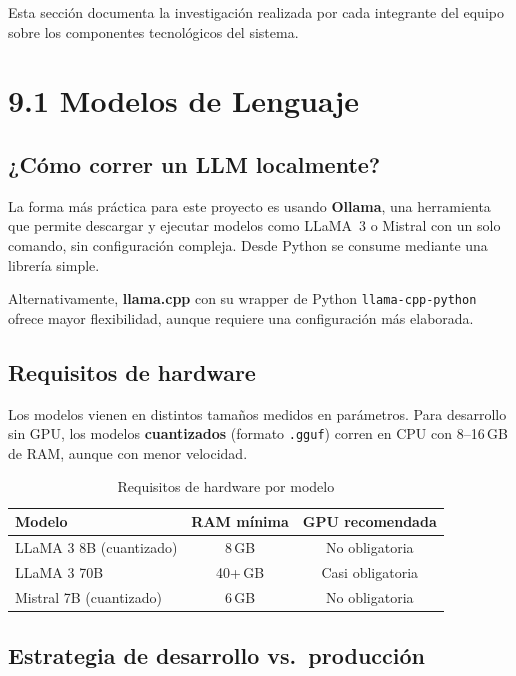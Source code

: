 \documentclass[12pt, a4paper]{report}
\begin{document}
Esta sección documenta la investigación realizada por cada integrante del equipo sobre los
componentes tecnológicos del sistema.

\section*{9.1 Modelos de Lenguaje}

\subsection*{¿Cómo correr un LLM localmente?}

La forma más práctica para este proyecto es usando \textbf{Ollama}, una herramienta que
permite descargar y ejecutar modelos como LLaMA~3 o Mistral con un solo comando, sin
configuración compleja. Desde Python se consume mediante una librería simple.

Alternativamente, \textbf{llama.cpp} con su wrapper de Python \texttt{llama-cpp-python}
ofrece mayor flexibilidad, aunque requiere una configuración más elaborada.

\subsection*{Requisitos de hardware}

Los modelos vienen en distintos tamaños medidos en parámetros. Para desarrollo sin GPU,
los modelos \textbf{cuantizados} (formato \texttt{.gguf}) corren en CPU con 8--16\,GB de
RAM, aunque con menor velocidad.

\begin{table}[H]
  \centering
  \begin{tabular}{lcc}
    \toprule
    \textbf{Modelo} & \textbf{RAM mínima} & \textbf{GPU recomendada} \\
    \midrule
    LLaMA 3 8B (cuantizado) & 8\,GB  & No obligatoria \\
    LLaMA 3 70B             & 40+\,GB & Casi obligatoria \\
    Mistral 7B (cuantizado) & 6\,GB  & No obligatoria \\
    \bottomrule
  \end{tabular}
  \caption{Requisitos de hardware por modelo}
\end{table}

\subsection*{Estrategia de desarrollo vs.\ producción}
\end{document}
